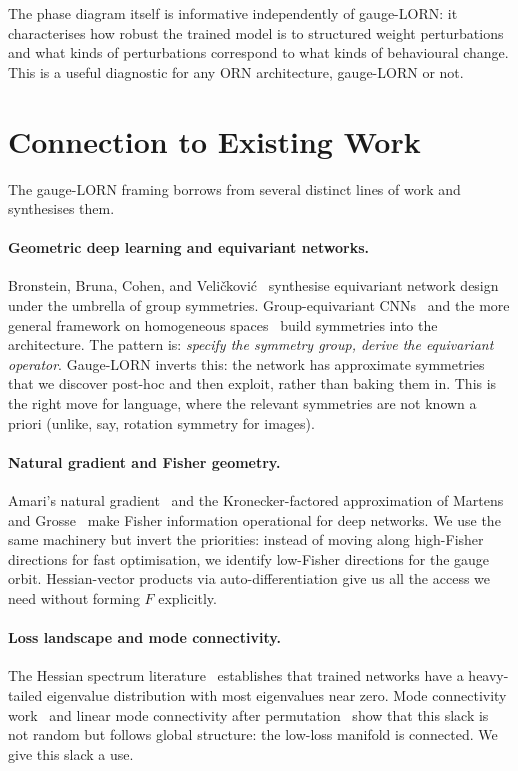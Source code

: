 \documentclass[11pt, a4paper]{article}
\theoremstyle{plain}
\theoremstyle{definition}
\theoremstyle{remark}
\begin{document}
The phase diagram itself is informative independently of gauge-LORN: it characterises how robust the trained model is to structured weight perturbations and what kinds of perturbations correspond to what kinds of behavioural change.
This is a useful diagnostic for any ORN architecture, gauge-LORN or not.


\section{Connection to Existing Work}
\label{sec:related-part2}

The gauge-LORN framing borrows from several distinct lines of work and synthesises them.

\paragraph{Geometric deep learning and equivariant networks.}
Bronstein, Bruna, Cohen, and Veli\v{c}kovi\'{c}~\cite{bronstein2021geometric} synthesise equivariant network design under the umbrella of group symmetries.
Group-equivariant CNNs~\cite{cohen2016group} and the more general framework on homogeneous spaces~\cite{cohen2019general} build symmetries into the architecture.
The pattern is: \emph{specify the symmetry group, derive the equivariant operator}.
Gauge-LORN inverts this: the network has approximate symmetries that we discover post-hoc and then exploit, rather than baking them in.
This is the right move for language, where the relevant symmetries are not known a priori (unlike, say, rotation symmetry for images).

\paragraph{Natural gradient and Fisher geometry.}
Amari's natural gradient~\cite{amari1998natural} and the Kronecker-factored approximation of Martens and Grosse~\cite{martens2015kfac} make Fisher information operational for deep networks.
We use the same machinery but invert the priorities: instead of moving along high-Fisher directions for fast optimisation, we identify low-Fisher directions for the gauge orbit.
Hessian-vector products via auto-differentiation give us all the access we need without forming $F$ explicitly.

\paragraph{Loss landscape and mode connectivity.}
The Hessian spectrum literature~\cite{sagun2016eigenvalues, papyan2019measurements, ghorbani2019investigation} establishes that trained networks have a heavy-tailed eigenvalue distribution with most eigenvalues near zero.
Mode connectivity work~\cite{garipov2018loss, draxler2018essentially} and linear mode connectivity after permutation~\cite{frankle2020linear, ainsworth2023git} show that this slack is not random but follows global structure: the low-loss manifold is connected.
We give this slack a use.
\end{document}

